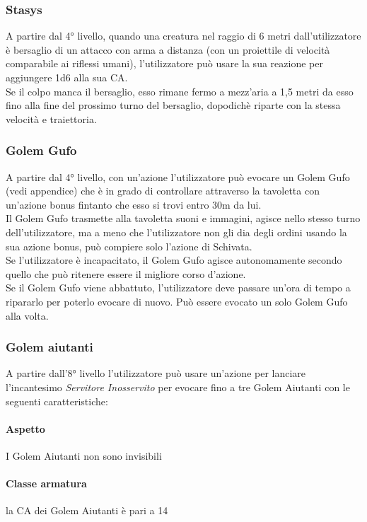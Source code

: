 \subsubsection{Stasys}
A partire dal 4° livello, quando una creatura nel raggio di 6 metri dall'utilizzatore è bersaglio di un attacco con arma a distanza (con un proiettile di velocità comparabile ai riflessi umani), l'utilizzatore può usare la sua reazione per aggiungere 1d6 alla sua CA.\\
Se il colpo manca il bersaglio, esso rimane fermo a mezz'aria a 1,5 metri da esso fino alla fine del prossimo turno del bersaglio, dopodichè riparte con la stessa velocità e traiettoria.

\subsubsection{Golem Gufo}
A partire dal 4° livello, con un'azione l'utilizzatore può evocare un Golem Gufo (vedi appendice) che è in grado di controllare attraverso la tavoletta con un'azione bonus fintanto che esso si trovi entro 30m da lui.\\ Il Golem Gufo trasmette alla tavoletta suoni e immagini, agisce nello stesso turno dell'utilizzatore, ma a meno che l'utilizzatore non gli dia degli ordini usando la sua azione bonus, può compiere solo l'azione di Schivata.\\ Se l'utilizzatore è incapacitato, il Golem Gufo agisce autonomamente secondo quello che può ritenere essere il migliore corso d'azione.\\ Se il Golem Gufo viene abbattuto, l'utilizzatore deve passare un'ora di tempo a ripararlo per poterlo evocare di nuovo. Può essere evocato un solo Golem Gufo alla volta.

\subsubsection{Golem aiutanti}
A partire dall'8° livello l'utilizzatore può usare un'azione per lanciare l'incantesimo \textit{Servitore Inosservito} per evocare fino a tre Golem Aiutanti con le seguenti caratteristiche:
\paragraph{Aspetto} I Golem Aiutanti non sono invisibili
\paragraph{Classe armatura} la CA dei Golem Aiutanti è pari a 14
